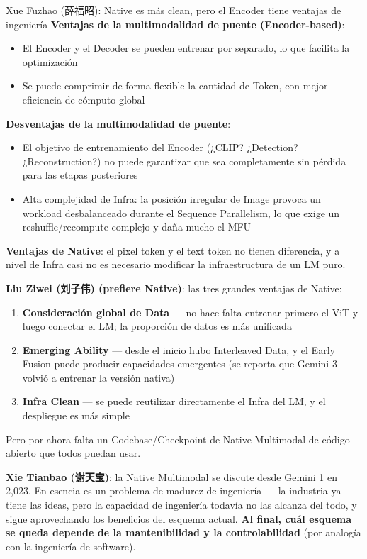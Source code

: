 \documentclass[a4paper]{article}
\begin{document}
\begin{importantbox}{Xue Fuzhao (薛福昭): Native es más clean, pero el Encoder tiene ventajas de ingeniería}
\textbf{Ventajas de la multimodalidad de puente (Encoder-based)}:
\begin{itemize}
  \item El Encoder y el Decoder se pueden entrenar por separado, lo que facilita la optimización
  \item Se puede comprimir de forma flexible la cantidad de Token, con mejor eficiencia de cómputo global
\end{itemize}
\textbf{Desventajas de la multimodalidad de puente}:
\begin{itemize}
  \item El objetivo de entrenamiento del Encoder (¿CLIP? ¿Detection? ¿Reconstruction?) no puede garantizar que sea completamente sin pérdida para las etapas posteriores
  \item Alta complejidad de Infra: la posición irregular de Image provoca un workload desbalanceado durante el Sequence Parallelism, lo que exige un reshuffle/recompute complejo y daña mucho el MFU
\end{itemize}
\textbf{Ventajas de Native}: el pixel token y el text token no tienen diferencia, y a nivel de Infra casi no es necesario modificar la infraestructura de un LM puro.
\end{importantbox}

\textbf{Liu Ziwei (刘子伟) (prefiere Native)}: las tres grandes ventajas de Native:
\begin{enumerate}
  \item \textbf{Consideración global de Data} — no hace falta entrenar primero el ViT y luego conectar el LM; la proporción de datos es más unificada
  \item \textbf{Emerging Ability} — desde el inicio hubo Interleaved Data, y el Early Fusion puede producir capacidades emergentes (se reporta que Gemini 3 volvió a entrenar la versión nativa)
  \item \textbf{Infra Clean} — se puede reutilizar directamente el Infra del LM, y el despliegue es más simple
\end{enumerate}
Pero por ahora falta un Codebase/Checkpoint de Native Multimodal de código abierto que todos puedan usar.

\textbf{Xie Tianbao (谢天宝)}: la Native Multimodal se discute desde Gemini 1 en 2,023. En esencia es un problema de madurez de ingeniería — la industria ya tiene las ideas, pero la capacidad de ingeniería todavía no las alcanza del todo, y sigue aprovechando los beneficios del esquema actual. \textbf{Al final, cuál esquema se queda depende de la mantenibilidad y la controlabilidad} (por analogía con la ingeniería de software).
\end{document}
